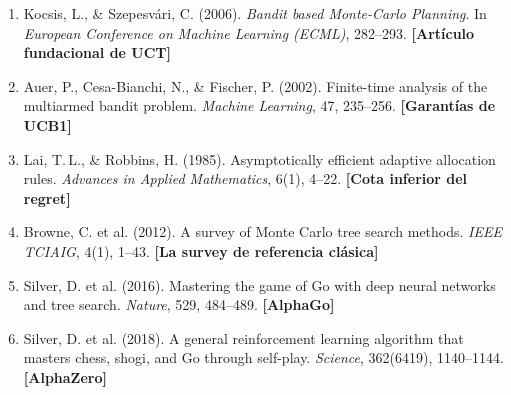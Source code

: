 \documentclass[12pt, a4paper]{article}
\begin{document}
\begin{enumerate}
  \item Kocsis, L., \& Szepesvári, C. (2006). \textit{Bandit based Monte-Carlo
    Planning}. In \textit{European Conference on Machine Learning (ECML)},
    282--293. \textbf{[Artículo fundacional de UCT]}

  \item Auer, P., Cesa-Bianchi, N., \& Fischer, P. (2002). Finite-time analysis
    of the multiarmed bandit problem. \textit{Machine Learning}, 47, 235--256.
    \textbf{[Garantías de UCB1]}

  \item Lai, T.\,L., \& Robbins, H. (1985). Asymptotically efficient adaptive
    allocation rules. \textit{Advances in Applied Mathematics}, 6(1), 4--22.
    \textbf{[Cota inferior del regret]}

  \item Browne, C. et al. (2012). A survey of Monte Carlo tree search methods.
    \textit{IEEE TCIAIG}, 4(1), 1--43. \textbf{[La survey de referencia clásica]}

  \item Silver, D. et al. (2016). Mastering the game of Go with deep neural
    networks and tree search. \textit{Nature}, 529, 484--489.
    \textbf{[AlphaGo]}

  \item Silver, D. et al. (2018). A general reinforcement learning algorithm
    that masters chess, shogi, and Go through self-play. \textit{Science},
    362(6419), 1140--1144. \textbf{[AlphaZero]}
\end{enumerate}
\end{document}
